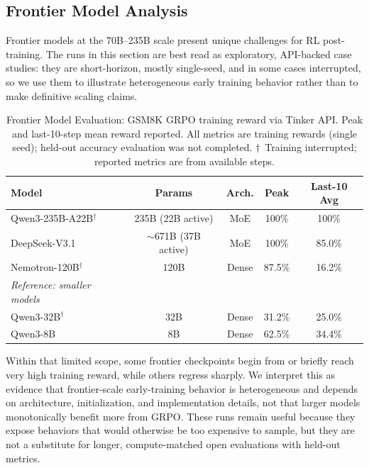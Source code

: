 \documentclass{article}
\begin{document}
\subsection{Frontier Model Analysis}
\label{sec:frontier}

Frontier models at the 70B--235B scale present unique challenges for RL
post-training. The runs in this section are best read as exploratory,
API-backed case studies: they are short-horizon, mostly single-seed, and in
some cases interrupted, so we use them to illustrate heterogeneous early
training behavior rather than to make definitive scaling claims.

\begin{table}[htbp]
\centering
\caption{Frontier Model Evaluation: GSM8K GRPO training reward via Tinker API.
Peak and last-10-step mean reward reported. All metrics are training rewards
(single seed); held-out accuracy evaluation was not completed.
$\dagger$~Training interrupted; reported metrics are from available steps.}
\label{tab:frontier}
\begin{tabular}{lcccc}
\toprule
\textbf{Model} & \textbf{Params} & \textbf{Arch.} & \textbf{Peak} & \textbf{Last-10 Avg} \\
\midrule
Qwen3-235B-A22B$^\dagger$ & 235B (22B active) & MoE & 100\% & 100\% \\
DeepSeek-V3.1 & $\sim$671B (37B active) & MoE & 100\% & 85.0\% \\
Nemotron-120B$^\dagger$ & 120B & Dense & 87.5\% & 16.2\% \\
\midrule
\textit{Reference: smaller models} & & & & \\
Qwen3-32B$^\dagger$ & 32B & Dense & 31.2\% & 25.0\% \\
Qwen3-8B & 8B & Dense & 62.5\% & 34.4\% \\
\bottomrule
\end{tabular}
\end{table}

Within that limited scope, some frontier checkpoints begin from or briefly
reach very high training reward, while others regress sharply. We interpret
this as evidence that frontier-scale early-training behavior is heterogeneous
and depends on architecture, initialization, and implementation details, not
that larger models monotonically benefit more from GRPO. These runs remain
useful because they expose behaviors that would otherwise be too expensive to
sample, but they are not a substitute for longer, compute-matched open
evaluations with held-out metrics.
\end{document}
